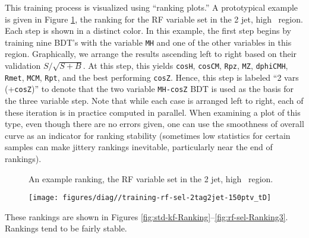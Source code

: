 This training process is visualized using ``ranking plots.''  A prototypical example is given in Figure \ref{fig:rankeg}, the ranking for the  RF variable set in the 2 jet, high \ptv\ region.  Each step is shown in a distinct color.  In this example, the first step begins by training nine BDT's with the variable \texttt{MH} and one of the other variables in this region.  Graphically, we arrange the results ascending left to right based on their validation $S/\sqrt{S+B}$.  At this step, this yields \texttt{cosH}, \texttt{cosCM}, \texttt{Rpz}, \texttt{MZ}, \texttt{dphiCMH}, \texttt{Rmet}, \texttt{MCM}, \texttt{Rpt}, and the best performing \texttt{cosZ}.  Hence, this step is labeled ``2 vars (+\texttt{cosZ})'' to denote that the two variable \texttt{MH-cosZ} BDT is used as the basis for the three variable step.  Note that while each case is arranged left to right, each of these iteration is in practice computed in parallel.  When examining a plot of this type, even though there are no errors given, one can use the smoothness of overall curve as an indicator for ranking stability (sometimes low statistics for certain samples can make jittery rankings inevitable, particularly near the end of rankings).
\begin{figure}[!bh]\captionsetup{justification=centering}
  \caption{An example ranking, the RF variable set in the 2 jet, high \ptv\ region.}
  \label{fig:rankeg}
\end{figure}
\addtocounter{figure}{-1}
\begin{landscape}
\begin{figure}[!htbp]\captionsetup{justification=centering}
  \centering
  \texttt{[image: figures/diag//training-rf-sel-2tag2jet-150ptv\_tD]}
\end{figure}
\end{landscape}\clearpage

These rankings are shown in Figures \ref{fig:std-kf-Ranking}--\ref{fig:rf-sel-Ranking3}.  Rankings tend to be fairly stable.

